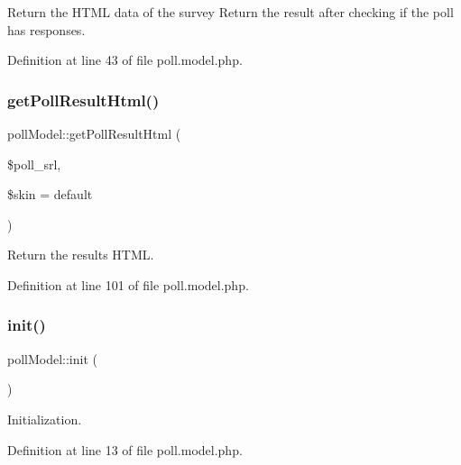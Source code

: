 Return the H\+T\+ML data of the survey Return the result after checking if the poll has responses. 



Definition at line 43 of file poll.\+model.\+php.

\mbox{\label{classpollModel_a035246abbecec9462c8dbbab1b86bcd4}} 
\subsubsection{\texorpdfstring{get\+Poll\+Result\+Html()}{getPollResultHtml()}}
{\footnotesize\ttfamily poll\+Model\+::get\+Poll\+Result\+Html (\begin{DoxyParamCaption}\item[{}]{\$poll\+\_\+srl,  }\item[{}]{\$skin = {\ttfamily \textquotesingle{}default\textquotesingle{}} }\end{DoxyParamCaption})}



Return the result\textquotesingle{}s H\+T\+ML. 



Definition at line 101 of file poll.\+model.\+php.

\mbox{\label{classpollModel_a201866e44c1ba55917c57b15ae37f984}} 
\subsubsection{\texorpdfstring{init()}{init()}}
{\footnotesize\ttfamily poll\+Model\+::init (\begin{DoxyParamCaption}{ }\end{DoxyParamCaption})}



Initialization. 



Definition at line 13 of file poll.\+model.\+php.

\mbox{\label{classpollModel_a2364a327ffba2641db0722cdcf0c40d7}} 
